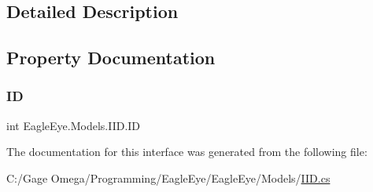 \subsection{Detailed Description}




\subsection{Property Documentation}
\mbox{\label{interface_eagle_eye_1_1_models_1_1_i_i_d_a9c97af76fec2f38889ea261ce98ca5f1}} 
\subsubsection{\texorpdfstring{ID}{ID}}
{\footnotesize\ttfamily int Eagle\+Eye.\+Models.\+I\+I\+D.\+ID\hspace{0.3cm}{\ttfamily [get]}}



The documentation for this interface was generated from the following file\+:\begin{DoxyCompactItemize}
\item 
C\+:/\+Gage Omega/\+Programming/\+Eagle\+Eye/\+Eagle\+Eye/\+Models/\mbox{\hyperlink{_i_i_d_8cs}{I\+I\+D.\+cs}}\end{DoxyCompactItemize}
